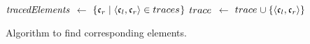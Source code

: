 \begin{algorithm}
    \begin{algorithmic}[1]
            \State $\mathit{tracedElements}$ $\leftarrow$ $\{ \mathfrak{c}_{r} \mid \langle \mathfrak{c}_{l}, \mathfrak{c}_{r} \rangle \in traces_{} \}$
             \label{algo:synchronization:findcorrespondingelements:line:explicit}
                    \State {}
                \EndIf
            \EndFor
             \label{algo:synchronization:findcorrespondingelements:line:implicit}
                    \State $trace_{}$ $\leftarrow$ $trace_{} \cup \{ \langle \mathfrak{c}_{l},\mathfrak{c}_{r} \rangle \}$
                    \State {}
                \EndIf 
            \EndFor
            \State {}
        \EndProcedure
    \end{algorithmic}
    \caption[Algorithm to find corresponding elements]{Algorithm to find corresponding elements.}
    \label{algo:synchronization:findcorrespondingelements}
\end{algorithm}

